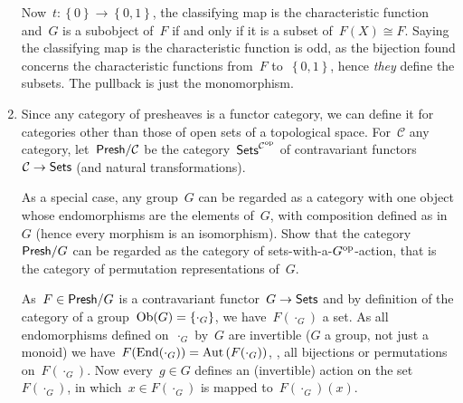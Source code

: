 \documentclass[a4paper,11pt,oneside,openany,article]{memoir}
\begin{document}
\begin{enumerate}
    \begin{solution}
      Now~$t\colon\left\{ 0 \right\}\to\left\{ 0,1 \right\}$, the classifying map is the characteristic function and~$G$ is a subobject of~$F$ if and only if it is a subset of~$F(X)\cong F$. Saying the classifying map is the characteristic function is odd, as the bijection found concerns the characteristic functions from~$F$ to~$\left\{ 0,1 \right\}$, hence \emph{they} define the subsets. The pullback is just the monomorphism.
    \end{solution}

  \item Since any category of presheaves is a functor category, we can define it for categories other than those of open sets of a topological space. For~$\mathcal{C}$ any category, let~$\mathsf{Presh}/\mathcal{C}$ be the category~$\mathsf{Sets}^{\mathcal{C}^{\operatorname{op}}}$ of contravariant functors~$\mathcal{C}\to\mathsf{Sets}$ (and natural transformations).

    As a special case, any group~$G$ can be regarded as a category with one object whose endomorphisms are the elements of~$G$, with composition defined as in~$G$ (hence every morphism is an isomorphism). Show that the category~$\mathsf{Presh}/G$ can be regarded as the category of sets-with-a-$G^{\operatorname{op}}$-action, that is the category of permutation representations of~$G$.

    \begin{solution}
      As~$F\in\mathsf{Presh}/G$ is a contravariant functor~$G\to\mathsf{Sets}$ and by definition of the category of a group~$\operatorname{Ob}(G)=\left\{ \cdot_G \right\}$, we have~$F(\cdot_G)$ a set. As all endomorphisms defined on~$\cdot_G$ by~$G$ are invertible ($G$ a group, not just a monoid) we have~$F(\operatorname{End}(\cdot_G))=\operatorname{Aut}\left( F(\cdot_G) \right)$, \ie, all bijections or permutations on~$F(\cdot_G)$. Now every~$g\in G$ defines an (invertible) action on the set~$F(\cdot_G)$, in which~$x\in F(\cdot_G)$ is mapped to~$F(\cdot_G)(x)$.
    \end{solution}

    \addtocounter{enumi}{2}



\end{enumerate}
\end{document}
